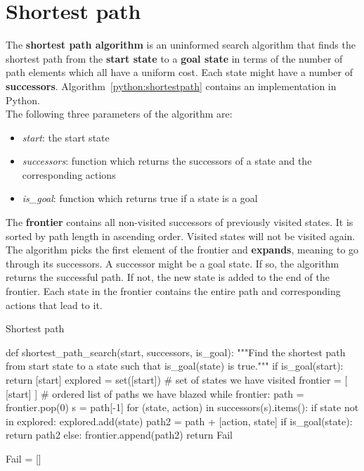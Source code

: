 \documentclass{report}
\begin{document}
\section{Shortest path}
The {\bf shortest path algorithm} is an uninformed search algorithm that finds the shortest path from the {\bf start state} to a {\bf goal state} in terms of the number of path elements which all have a uniform cost.
Each state might have a number of {\bf successors}. Algorithm~\ref{python:shortestpath} contains an implementation in Python.
\\
The following three parameters of the algorithm are:
\begin{itemize}
\item {\em start}: the start state
\item {\em successors}: function which returns the successors of a state and the corresponding actions
\item {\em is\_goal}: function which returns true if a state is a goal
\end{itemize}
The {\bf frontier} contains all non-visited successors of previously visited states. It is sorted by path length in ascending order. Visited states will not be visited again.
The algorithm picks the first element of the frontier and {\bf expands}, meaning to go through its successors.
A successor might be a goal state. If so, the algorithm returns the successful path.
If not, the new state is added to the end of the frontier.
Each state in the frontier contains the entire path and corresponding actions that lead to it.


\begin{algorithm}
\caption{Shortest path}
\label{python:shortestpath}
\begin{python}
def shortest_path_search(start, successors, is_goal):
    """Find the shortest path from start state to a state
    such that is_goal(state) is true."""
    if is_goal(start):
        return [start]
    explored = set([start]) # set of states we have visited
    frontier = [ [start] ] # ordered list of paths we have blazed
    while frontier:
        path = frontier.pop(0)
        s = path[-1]
        for (state, action) in successors(s).items():
            if state not in explored:
                explored.add(state)
                path2 = path + [action, state]
                if is_goal(state):
                    return path2
                else:
                    frontier.append(path2)
    return Fail

Fail = []
\end{python}
\end{algorithm}
\end{document}
